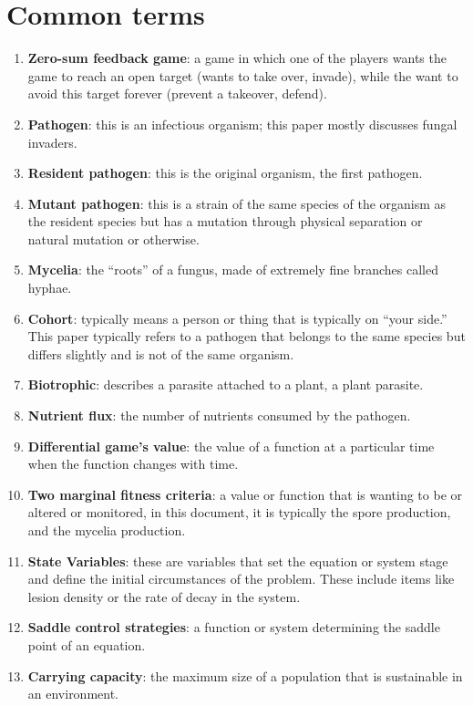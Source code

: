 \documentclass[11pt]{amsart}
\begin{document}
\appendix

\section{Common terms}\label{terms}
\begin{enumerate}
    \item\label{term:zerosum} \textbf{Zero-sum feedback game}: a game in which one of the players wants the game to reach an open target (wants to take over, invade), while the want to avoid this target forever (prevent a takeover, defend)\cite{zerosumgame}.
    \item\label{term:pathogen} \textbf{Pathogen}: this is an infectious organism; this paper mostly discusses fungal invaders.
    \item\label{term:resident} \textbf{Resident pathogen}: this is the original organism, the first pathogen.
    \item\label{term:mutant} \textbf{Mutant pathogen}: this is a strain of the same species of the organism as the resident species but has a mutation through physical separation or natural mutation or otherwise.
    \item\label{term:mycelia} \textbf{Mycelia}: the ``roots'' of a fungus, made of extremely fine branches called hyphae. 
    \item\label{term:cohort} \textbf{Cohort}: typically means a person or thing that is typically on ``your side.'' This paper typically refers to a pathogen that belongs to the same species but differs slightly and is not of the same organism.
    \item\label{term:biotrohpic} \textbf{Biotrophic}: describes a parasite attached to a plant, a plant parasite. 
    \item\label{term:nutrientflux} \textbf{Nutrient flux}: the number of nutrients consumed by the pathogen.
    \item\label{term:differentialgame} \textbf{Differential game's value}:  the value of a function at a particular time when the function changes with time. 
    \item\label{term:marginal} \textbf{Two marginal fitness criteria}: a value or function that is wanting to be or altered or monitored, in this document, it is typically the spore production, and the mycelia production.
    \item\label{term:statevariables} \textbf{State Variables}: these are variables that set the equation or system stage and define the initial circumstances of the problem. These include items like lesion density or the rate of decay in the system.
    \item\label{term:saddlecontrol} \textbf{Saddle control strategies}: a function or system determining the saddle point of an equation.
    \item\label{term:carryingcapacity} \textbf{Carrying capacity}: the maximum size of a population that is sustainable in an environment.
    
\end{enumerate}
\end{document}
